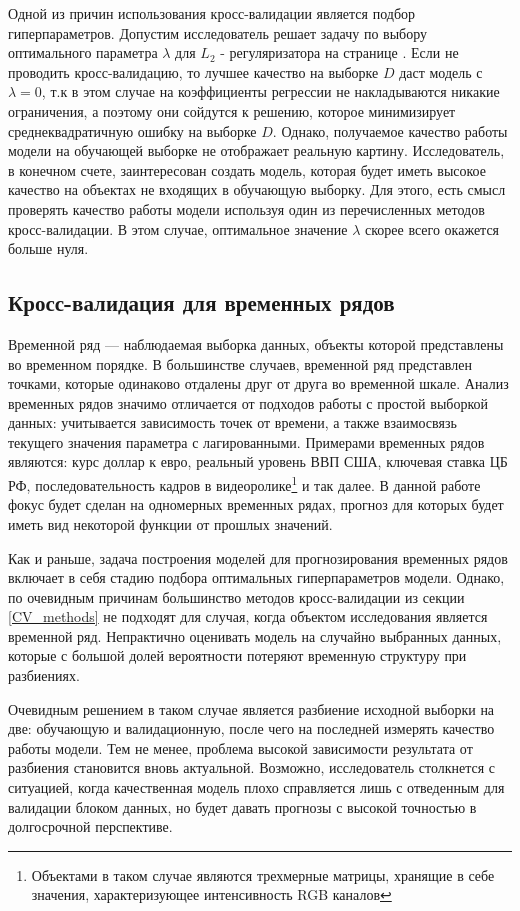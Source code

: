 \documentclass[a4paper, 14pt]{article}
\begin{document}
Одной из причин использования кросс-валидации является подбор гиперпараметров. Допустим исследователь решает задачу по выбору оптимального параметра $\lambda$ для $L_2$ - регуляризатора на странице \pageref{ridge}. Если не проводить кросс-валидацию, то лучшее качество на выборке $D$ даст модель с $\lambda = 0$, т.к в этом случае на коэффициенты регрессии не накладываются никакие ограничения, а поэтому они сойдутся к решению, которое минимизирует среднеквадратичную ошибку на выборке $D$. Однако, получаемое качество работы модели на обучающей выборке не отображает реальную картину. Исследователь, в конечном счете, заинтересован создать модель, которая будет иметь высокое качество на объектах не входящих в обучающую выборку. Для этого, есть смысл проверять качество работы модели используя один из перечисленных методов кросс-валидации. В этом случае, оптимальное значение $\lambda$ скорее всего окажется больше нуля.

\subsection{Кросс-валидация для временных рядов}

Временной ряд --- наблюдаемая выборка данных, объекты которой представлены во временном порядке. В большинстве случаев, временной ряд представлен точками, которые одинаково отдалены друг от друга во временной шкале. Анализ временных рядов значимо отличается от подходов работы с простой выборкой данных:  учитывается зависимость точек от времени, а также взаимосвязь текущего значения параметра с лагированными. Примерами временных рядов являются: курс доллар к евро, реальный уровень ВВП США, ключевая ставка ЦБ РФ, последовательность кадров в видеоролике\footnote{Объектами в таком случае являются трехмерные матрицы, хранящие в себе значения, характеризующее интенсивность RGB каналов} и так далее. В данной работе фокус будет сделан на одномерных временных рядах, прогноз для которых будет иметь вид некоторой функции от прошлых значений. 

Как и раньше, задача построения моделей для прогнозирования временных рядов включает в себя стадию подбора оптимальных гиперпараметров модели. Однако, по очевидным причинам большинство методов кросс-валидации из секции \ref{CV_methods} не подходят для случая, когда объектом исследования является временной ряд. Непрактично оценивать модель на случайно выбранных данных, которые с большой долей вероятности потеряют временную структуру при разбиениях. 

Очевидным решением в таком случае является разбиение исходной выборки на две: обучающую и валидационную, после чего на последней измерять качество работы модели. Тем не менее, проблема высокой зависимости результата от разбиения становится вновь актуальной. Возможно, исследователь столкнется с ситуацией, когда качественная модель плохо справляется лишь с отведенным для валидации блоком данных, но будет давать прогнозы с высокой точностью в долгосрочной перспективе. 
\end{document}
